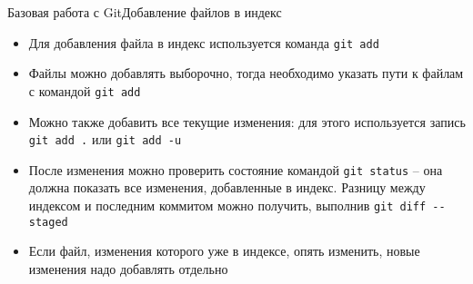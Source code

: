 \begin{frame}{Базовая работа с Git}{Добавление файлов в индекс}
    \begin{itemize}
        \item
              Для добавления файла в индекс используется команда \lstinline[style=BashInputStyle]{git add}
        \item
              Файлы можно добавлять выборочно, тогда необходимо указать пути к файлам с командой \lstinline[style=BashInputStyle]{git add}
        \item
              Можно также добавить все текущие изменения: для этого используется запись \lstinline[style=BashInputStyle]{git add .} или \lstinline[style=BashInputStyle]{git add -u}
        \item
              После изменения можно проверить состояние командой \lstinline[style=BashInputStyle]{git status} -- она должна показать все изменения, добавленные в индекс. Разницу между индексом и последним коммитом можно получить, выполнив \lstinline[style=BashInputStyle]{git diff --staged}
        \item
              Если файл, изменения которого уже в индексе, опять изменить, новые изменения надо добавлять отдельно
    \end{itemize}
\end{frame}
